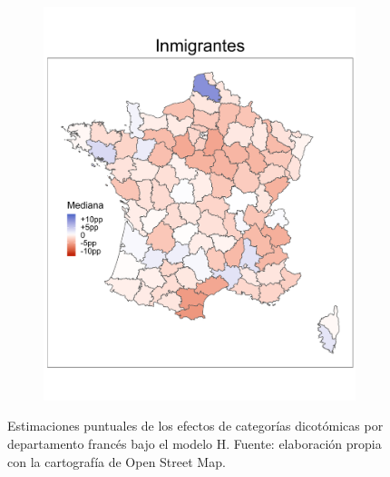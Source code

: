 \begin{figure}
\begin{subfigure}{0.275\textwidth}
	\includegraphics[width = \textwidth]{Figs/Efectos/Mapa_Efectos_Inm_Modelo_H}
	\end{subfigure}
	\caption{Estimaciones puntuales de los efectos de categorías dicotómicas por departamento francés bajo el modelo H. Fuente: elaboración propia con la cartografía de Open Street Map.}
	\label{fig:Mapa_Efectos_Dicotom}
\end{figure}

